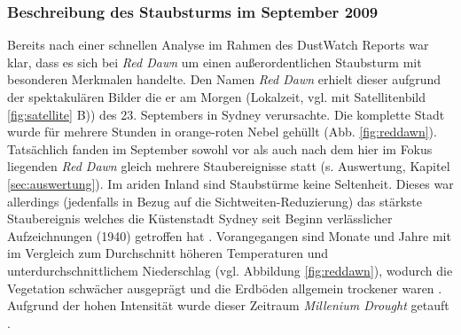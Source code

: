 \documentclass[12pt,a4paper,onecolumn]{scrartcl}
\begin{document}
\subsubsection{Beschreibung des Staubsturms im September 2009} \label{sec:reddawn}
Bereits nach einer schnellen Analyse im Rahmen des DustWatch Reports \citep{Leys.2009} war klar, dass es sich bei \textit{Red Dawn} um einen außerordentlichen Staubsturm mit besonderen Merkmalen handelte. Den Namen \textit{Red Dawn} erhielt dieser aufgrund der spektakulären Bilder die er am Morgen (Lokalzeit, vgl. mit Satellitenbild \ref{fig:satellite} B)) des 23. Septembers in Sydney verursachte. Die komplette Stadt wurde für mehrere Stunden in orange-roten Nebel gehüllt (Abb. \ref{fig:reddawn}). Tatsächlich fanden im September sowohl vor als auch nach dem hier im Fokus liegenden \textit{Red Dawn} gleich mehrere Staubereignisse statt (s. Auswertung, Kapitel \ref{sec:auswertung}). Im ariden Inland sind Staubstürme keine Seltenheit. Dieses war allerdings (jedenfalls in Bezug auf die Sichtweiten-Reduzierung) das stärkste Staubereignis welches die Küstenstadt Sydney seit Beginn verlässlicher Aufzeichnungen (1940) getroffen hat \citep{Leys.2011}. Vorangegangen sind Monate und Jahre mit im Vergleich zum Durchschnitt höheren Temperaturen und unterdurchschnittlichem Niederschlag (vgl. Abbildung \ref{fig:reddawn}), wodurch die Vegetation schwächer ausgeprägt und die Erdböden allgemein trockener waren \citep{Leys.2011}. Aufgrund der hohen Intensität wurde dieser Zeitraum \textit{Millenium Drought} getauft \citep{Deckker.2014}.
\end{document}
